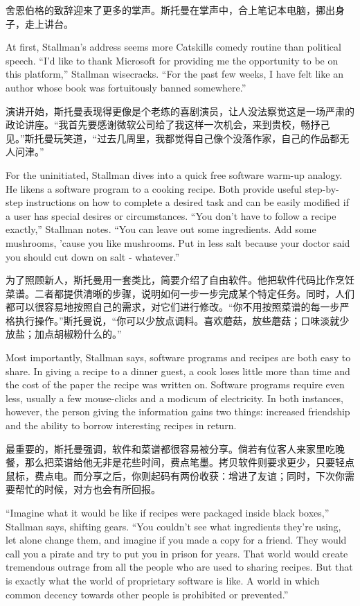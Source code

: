 \ifdefined\chs
舍恩伯格的致辞迎来了更多的掌声。斯托曼在掌声中，合上笔记本电脑，挪出身子，走上讲台。
\fi

\ifdefined\eng
At first, Stallman's address seems more Catskills comedy routine than political speech. ``I'd like to thank Microsoft for providing me the opportunity to be on this platform,'' Stallman wisecracks. ``For the past few weeks, I have felt like an author whose book was fortuitously banned somewhere.''
\fi

\ifdefined\chs
演讲开始，斯托曼表现得更像是个老练的喜剧演员，让人没法察觉这是一场严肃的政论讲座。``我首先要感谢微软公司给了我这样一次机会，来到贵校，畅抒己见。''斯托曼玩笑道，``过去几周里，我都觉得自己像个没落作家，自己的作品都无人问津。''
\fi

\ifdefined\eng
For the uninitiated, Stallman dives into a quick free software warm-up analogy. He likens a software program to a cooking recipe. Both provide useful step-by-step instructions on how to complete a desired task and can be easily modified if a user has special desires or circumstances. ``You don't have to follow a recipe exactly,'' Stallman notes. ``You can leave out some ingredients. Add some mushrooms, 'cause you like mushrooms. Put in less salt because your doctor said you should cut down on salt - whatever.''
\fi

\ifdefined\chs
为了照顾新人，斯托曼用一套类比，简要介绍了自由软件。他把软件代码比作烹饪菜谱。二者都提供清晰的步骤，说明如何一步一步完成某个特定任务。同时，人们都可以很容易地按照自己的需求，对它们进行修改。``你不用按照菜谱的每一步严格执行操作。''斯托曼说，``你可以少放点调料。喜欢蘑菇，放些蘑菇；口味淡就少放盐；加点胡椒粉什么的。''
\fi

\ifdefined\eng
Most importantly, Stallman says, software programs and recipes are both easy to share. In giving a recipe to a dinner guest, a cook loses little more than time and the cost of the paper the recipe was written on. Software programs require even less, usually a few mouse-clicks and a modicum of electricity. In both instances, however, the person giving the information gains two things: increased friendship and the ability to borrow interesting recipes in return.
\fi

\ifdefined\chs
最重要的，斯托曼强调，软件和菜谱都很容易被分享。倘若有位客人来家里吃晚餐，那么把菜谱给他无非是花些时间，费点笔墨。拷贝软件则要求更少，只要轻点鼠标，费点电。而分享之后，你则起码有两份收获：增进了友谊；同时，下次你需要帮忙的时候，对方也会有所回报。
\fi

\ifdefined\eng
``Imagine what it would be like if recipes were packaged inside black boxes,'' Stallman says, shifting gears. ``You couldn't see what ingredients they're using, let alone change them, and imagine if you made a copy for a friend. They would call you a pirate and try to put you in prison for years. That world would create tremendous outrage from all the people who are used to sharing recipes. But that is exactly what the world of proprietary software is like. A world in which common decency towards other people is prohibited or prevented.''
\fi


